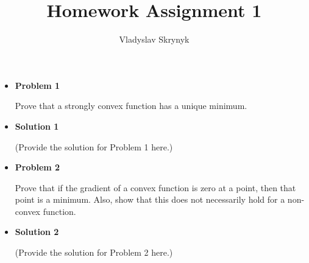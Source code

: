 \documentclass{article}
\begin{document}
\title{Homework Assignment 1}
\date{Vladyslav Skrynyk}
\maketitle

\begin{itemize}[label=\textbullet, itemsep=10pt]
    \item \textbf{Problem 1}
    
    {\fontsize{12}{14}\selectfont Prove that a strongly convex function has a unique minimum.}
    
    \item \textbf{Solution 1}
    
    {\fontsize{12}{14}\selectfont (Provide the solution for Problem 1 here.)}
    
    \item \textbf{Problem 2}
    
    {\fontsize{12}{14}\selectfont Prove that if the gradient of a convex function is zero at a point, then that point is a minimum. Also, show that this does not necessarily hold for a non-convex function.}
    
    \item \textbf{Solution 2}
    
    {\fontsize{12}{14}\selectfont (Provide the solution for Problem 2 here.)}
\end{itemize}
\end{document}
